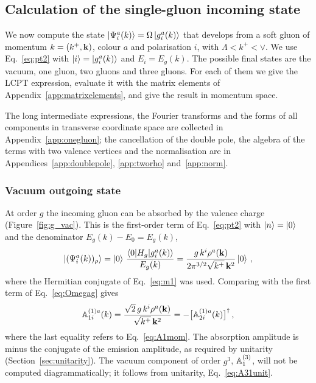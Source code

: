 \subsection{Calculation of the single-gluon incoming state}\label{sec:onegin}

We now compute the state $\ket{\Psi^a_i(k)}=\Omega\ket{g^a_i(k)}$ that develops from a soft gluon of momentum $k=(k^+,\mathbf{k})$, colour $a$ and polarisation $i$, with $\Lambda<k^+<\vee$. We use Eq.~\eqref{eq:pt2} with $\ket i=\ket{g^a_i(k)}$ and $E_i=E_g(k)$. The possible final states are the vacuum, one gluon, two gluons and three gluons. For each of them we give the LCPT expression, evaluate it with the matrix elements of Appendix~\ref{app:matrixelements}, and give the result in momentum space.

The long intermediate expressions, the Fourier transforms and the forms of all components in transverse coordinate space are collected in Appendix~\ref{app:onegluon}; the cancellation of the double pole, the algebra of the terms with two valence vertices and the normalisation are in Appendices~\ref{app:doublepole}, \ref{app:tworho} and~\ref{app:norm}.

\subsubsection{Vacuum outgoing state}\label{sec:vacout}

At order $g$ the incoming gluon can be absorbed by the valence charge (Figure~\ref{fig:g_vac}). This is the first-order term of Eq.~\eqref{eq:pt2} with $\ket n=\ket0$ and the denominator $E_g(k)-E_0=E_g(k)$,
\begin{align}\label{eq:psi_rho}
\ket{(\Psi^a_i(k))_\rho}=\ket0\,\frac{\braket{0|H_g|g^a_i(k)}}{E_g(k)}=\frac{g\,k^i\rho^a(\mathbf{k})}{2\pi^{3/2}\sqrt{k^+}\,\mathbf{k}^2}\ket0\,,
\end{align}
where the Hermitian conjugate of Eq.~\eqref{eq:m1} was used. Comparing with the first term of Eq.~\eqref{eq:Omegag} gives
\begin{align}\label{eq:A11mom}
\mathbb{A}^{(1)a}_{1i}(k)=\frac{\sqrt2\,g\,k^i\rho^a(\mathbf{k})}{\sqrt{k^+}\,\mathbf{k}^2}=-\big[\mathbb{A}^{(1)a}_{2i}(k)\big]^\dagger\,,
\end{align}
where the last equality refers to Eq.~\eqref{eq:A1mom}. The absorption amplitude is minus the conjugate of the emission amplitude, as required by unitarity (Section~\ref{sec:unitarity}). The vacuum component of order $g^3$, $\mathbb{A}^{(3)}_1$, will not be computed diagrammatically; it follows from unitarity, Eq.~\eqref{eq:A31unit}.

